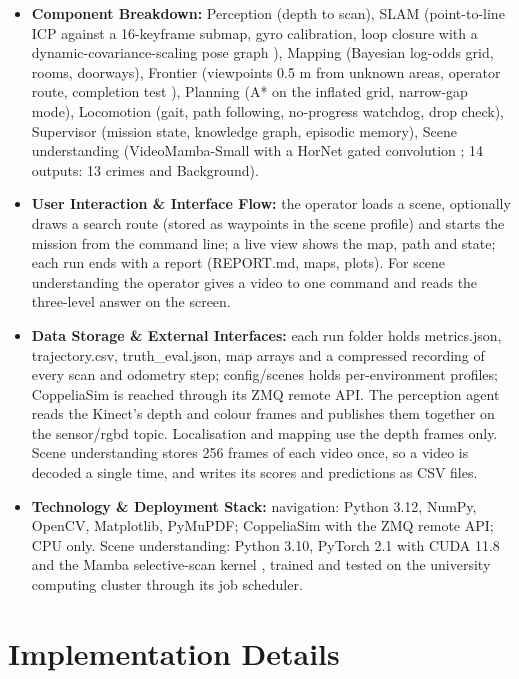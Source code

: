 \documentclass[11pt, a4paper]{article}
\begin{document}
\begin{itemize}[noitemsep, topsep=2pt]
    \item \textbf{Component Breakdown:} Perception (depth to scan), SLAM (point-to-line ICP against a 16-keyframe submap, gyro calibration, loop closure with a dynamic-covariance-scaling pose graph \cite{agarwal2013,censi2008}), Mapping (Bayesian log-odds grid, rooms, doorways), Frontier (viewpoints 0.5 m from unknown areas, operator route, completion test \cite{yamauchi1997}), Planning (A* on the inflated grid, narrow-gap mode), Locomotion (gait, path following, no-progress watchdog, drop check), Supervisor (mission state, knowledge graph, episodic memory), Scene understanding (VideoMamba-Small \cite{li2024videomamba} with a HorNet gated convolution \cite{rao2022}; 14 outputs: 13 crimes and Background).
    \item \textbf{User Interaction \& Interface Flow:} the operator loads a scene, optionally draws a search route (stored as waypoints in the scene profile) and starts the mission from the command line; a live view shows the map, path and state; each run ends with a report (REPORT.md, maps, plots). For scene understanding the operator gives a video to one command and reads the three-level answer on the screen.
    \item \textbf{Data Storage \& External Interfaces:} each run folder holds metrics.json, trajectory.csv, truth\_eval.json, map arrays and a compressed recording of every scan and odometry step; config/scenes holds per-environment profiles; CoppeliaSim is reached through its ZMQ remote API. The perception agent reads the Kinect's depth and colour frames and publishes them together on the sensor/rgbd topic. Localisation and mapping use the depth frames only. Scene understanding stores 256 frames of each video once, so a video is decoded a single time, and writes its scores and predictions as CSV files.
    \item \textbf{Technology \& Deployment Stack:} navigation: Python 3.12, NumPy, OpenCV, Matplotlib, PyMuPDF; CoppeliaSim with the ZMQ remote API; CPU only. Scene understanding: Python 3.10, PyTorch 2.1 with CUDA 11.8 and the Mamba selective-scan kernel \cite{gu2023}, trained and tested on the university computing cluster through its job scheduler.
\end{itemize}

\section{Implementation Details}
\end{document}
